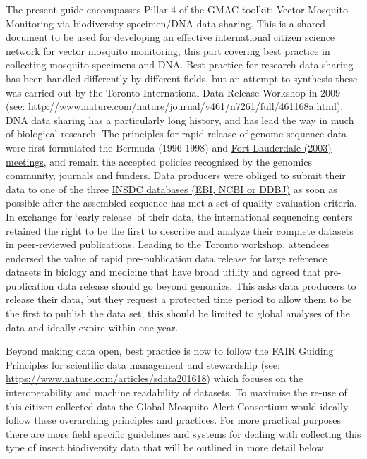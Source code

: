 \documentclass[
]{article}
\begin{document}
The present guide encompasses Pillar 4 of the GMAC toolkit: Vector Mosquito Monitoring via biodiversity specimen/DNA data sharing. This is a shared document to be used for developing an effective international citizen science network for vector mosquito monitoring, this part covering best practice in collecting mosquito specimens and DNA. Best practice for research data sharing has been handled differently by different fields, but an attempt to synthesis these was carried out by the Toronto International Data Release Workshop in 2009 (see: \url{http://www.nature.com/nature/journal/v461/n7261/full/461168a.html}). DNA data sharing has a particularly long history, and has lead the way in much of biological research. The principles for rapid release of genome-sequence data were first formulated the Bermuda (1996-1998) and \href{https://www.genome.gov/10506537/}{Fort Lauderdale (2003) meetings}, and remain the accepted policies recognised by the genomics community, journals and funders. Data producers were obliged to submit their data to one of the three \href{http://www.insdc.org/}{INSDC databases (EBI, NCBI or DDBJ)} as soon as possible after the assembled sequence has met a set of quality evaluation criteria. In exchange for `early release' of their data, the international sequencing centers retained the right to be the first to describe and analyze their complete datasets in peer-reviewed publications. Leading to the Toronto workshop, attendees endorsed the value of rapid pre-publication data release for large reference datasets in biology and medicine that have broad utility and agreed that pre-publication data release should go beyond genomics. This asks data producers to release their data, but they request a protected time period to allow them to be the first to publish the data set, this should be limited to global analyses of the data and ideally expire within one year.

Beyond making data open, best practice is now to follow the FAIR Guiding Principles for scientific data management and stewardship (see: \url{https://www.nature.com/articles/sdata201618}) which focuses on the interoperability and machine readability of datasets. To maximise the re-use of this citizen collected data the Global Mosquito Alert Consortium would ideally follow these overarching principles and practices. For more practical purposes there are more field specific guidelines and systems for dealing with collecting this type of insect biodiversity data that will be outlined in more detail below.
\end{document}
